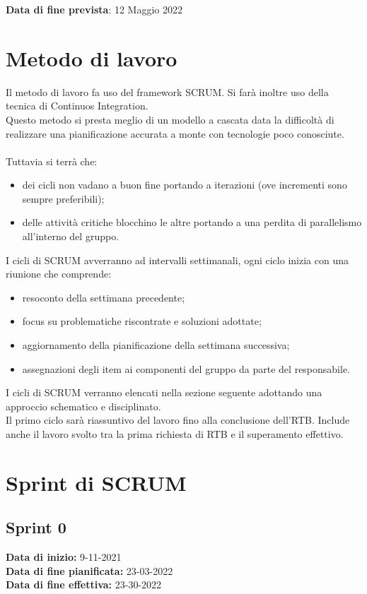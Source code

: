 \documentclass[a4paper, 12pt]{article}
\begin{document}
\textbf{Data di fine prevista}: 12 Maggio 2022

\section{Metodo di lavoro}
Il metodo di lavoro fa uso del framework SCRUM. Si farà inoltre uso della tecnica di Continuos Integration.\\
Questo metodo si presta meglio di un modello a cascata data la difficoltà di realizzare una pianificazione accurata a monte con tecnologie poco conosciute.\\\\
Tuttavia si terrà che:
\begin{itemize}
    \item dei cicli non vadano a buon fine portando a iterazioni (ove incrementi sono sempre preferibili);
    \item delle attività critiche blocchino le altre portando a una perdita di parallelismo all'interno del gruppo.
\end{itemize}
I cicli di SCRUM avverranno ad intervalli settimanali, ogni ciclo inizia con una riunione che comprende:
\begin{itemize}
    \item resoconto della settimana precedente;
    \item focus su problematiche riscontrate e soluzioni adottate;
    \item aggiornamento della pianificazione della settimana successiva;
    \item assegnazioni degli item ai componenti del gruppo da parte del responsabile.
\end{itemize}
I cicli di SCRUM verranno elencati nella sezione seguente adottando una approccio schematico e disciplinato.\\
Il primo ciclo sarà riassuntivo del lavoro fino alla conclusione dell'RTB. Include anche il lavoro svolto tra la prima richiesta di RTB e il superamento effettivo.

\section{Sprint di SCRUM}

\subsection{Sprint 0}
\textbf{Data di inizio:} 9-11-2021\\
\textbf{Data di fine pianificata:} 23-03-2022\\
\textbf{Data di fine effettiva:} 23-30-2022
\end{document}
